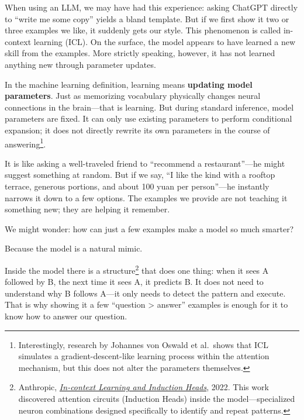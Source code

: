 When using an LLM, we may have had this experience: asking ChatGPT directly to ``write me some copy'' yields a bland template. But if we first show it two or three examples we like, it suddenly gets our style. This phenomenon is called in-context learning (ICL). On the surface, the model appears to have learned a new skill from the examples. More strictly speaking, however, it has not learned anything new through parameter updates.

\vspace{1em}

In the machine learning definition, learning means \textbf{updating model parameters}. Just as memorizing vocabulary physically changes neural connections in the brain---that is learning. But during standard inference, model parameters are fixed. It can only use existing parameters to perform conditional expansion; it does not directly rewrite its own parameters in the course of answering\footnote{Interestingly, research by Johannes von Oswald et al.\ shows that ICL simulates a gradient-descent-like learning process within the attention mechanism, but this does not alter the parameters themselves.}.

\vspace{1em}

It is like asking a well-traveled friend to ``recommend a restaurant''---he might suggest something at random. But if we say, ``I like the kind with a rooftop terrace, generous portions, and about 100 yuan per person''---he instantly narrows it down to a few options.
The examples we provide are not teaching it something new; they are helping it remember.

We might wonder: how can just a few examples make a model so much smarter?

Because the model is a natural mimic.

Inside the model there is a structure\footnote{Anthropic, \href{https://transformer-circuits.pub/2022/in-context-learning-and-induction-heads/index.html}{\textit{In-context Learning and Induction Heads}}, 2022. This work discovered attention circuits (Induction Heads) inside the model---specialized neuron combinations designed specifically to identify and repeat patterns.} that does one thing: when it sees A followed by B, the next time it sees A, it predicts B. It does not need to understand why B follows A---it only needs to detect the pattern and execute. That is why showing it a few ``question > answer'' examples is enough for it to know how to answer our question.

